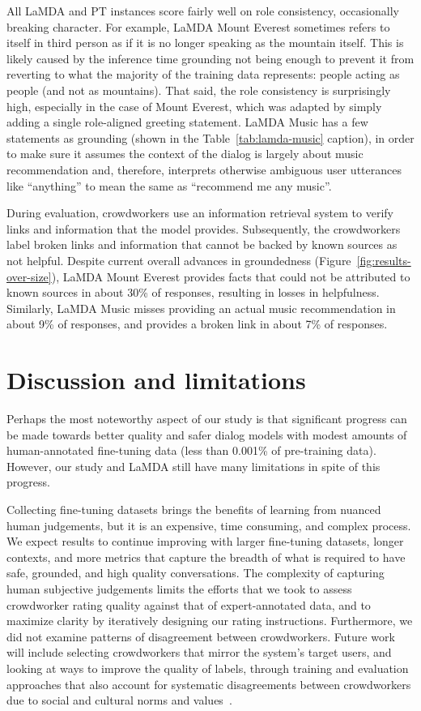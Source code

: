 \documentclass{article}
\begin{document}
All LaMDA and PT instances score fairly well on role consistency, occasionally breaking character. For example, LaMDA Mount Everest sometimes refers to itself in third person as if it is no longer speaking as the mountain itself. This is likely caused by the inference time grounding not being enough to prevent it from reverting to what the majority of the training data represents: people acting as people (and not as mountains). That said, the role consistency is surprisingly high, especially in the case of Mount Everest, which was adapted by simply adding a single role-aligned greeting statement. LaMDA Music has a few statements as grounding (shown in the Table~\ref{tab:lamda-music} caption), in order to make sure it assumes the context of the dialog is largely about music recommendation and, therefore, interprets otherwise ambiguous user utterances like ``anything'' to mean the same as ``recommend me any music''.

During evaluation, crowdworkers use an information retrieval system to verify links and information that the model provides. Subsequently, the crowdworkers label broken links and information that cannot be backed by known sources as not helpful. Despite current overall advances in groundedness (Figure~\ref{fig:results-over-size}), LaMDA Mount Everest provides facts that could not be attributed to known sources in about 30\% of responses, resulting in losses in helpfulness. Similarly, LaMDA Music misses providing an actual music recommendation in about 9\% of responses, and provides a broken link in about 7\% of responses. 

\FloatBarrier

\section{Discussion and limitations}

Perhaps the most noteworthy aspect of our study is that significant progress can be made towards better quality and safer dialog models with modest amounts of human-annotated fine-tuning data (less than 0.001\% of pre-training data). However, our study and LaMDA still have many limitations in spite of this progress.

Collecting fine-tuning datasets brings the benefits of learning from nuanced human judgements, but it is an expensive, time consuming, and complex process. We expect results to continue improving with larger fine-tuning datasets, longer contexts, and more metrics that capture the breadth of what is required to have safe, grounded, and high quality conversations. The complexity of capturing human subjective judgements limits the efforts that we took to assess crowdworker rating quality against that of expert-annotated data, and to maximize clarity by iteratively designing our rating instructions. Furthermore, we did not examine patterns of disagreement between crowdworkers. Future work will include selecting crowdworkers that mirror the system's target users, and looking at ways to improve the quality of labels, through training and evaluation approaches that also account for systematic disagreements between crowdworkers due to social and cultural norms and values~\cite{Aroyo_Welty_2015}.
\end{document}
